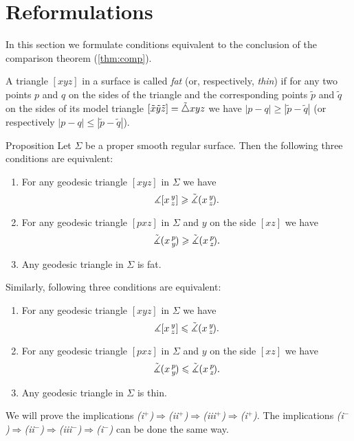 \section{Reformulations}

In this section we formulate conditions equivalent to the conclusion of the comparison theorem (\ref{thm:comp}).

A triangle $[xyz]$ in a surface is called \emph{fat} (or, respectively, \emph{thin})
if for any two points $p$ and $q$ on the sides of the triangle and the corresponding points 
$\tilde p$ and $\tilde q$ on the sides of its model triangle $[\tilde x\tilde y\tilde z]\z=\tilde \triangle xyz$ we have
$|p-q|\ge |\tilde p-\tilde q|$ (or respectively $|p-q|\le |\tilde p-\tilde q|$).


\begin{thm}{Proposition}\label{prop:comp-reformulations}
Let $\Sigma$ be a proper smooth regular surface.
Then the following three conditions are equivalent:
\begin{enumerate}[(i$^{+}$)]
\item For any geodesic triangle $[xyz]$ in $\Sigma$ we have
 \[\measuredangle[x\,{}^{y}_{z}]\geqslant\tilde\measuredangle(x\,{}^{y}_{z}\hspace{-0.2ex}).\]
\item For any geodesic triangle $[pxz]$ in $\Sigma$ and $y$ on the side $[xz]$ we have
 \[\tilde\measuredangle(x\,{}^{p}_{y}\hspace{-0.2ex}) \geqslant \tilde\measuredangle(x\,{}^{p}_{z}\hspace{-0.2ex}).\]
\item Any geodesic triangle in $\Sigma$ is fat.
\end{enumerate}

\medskip

Similarly, following three conditions are equivalent:
\begin{enumerate}[(i$^{-}$)]
\item For any geodesic triangle $[xyz]$ in $\Sigma$ we have
 \[\measuredangle[x\,{}^{y}_{z}]\leqslant\tilde\measuredangle(x\,{}^{y}_{z}\hspace{-0.2ex}).\]
\item For any geodesic triangle $[pxz]$ in $\Sigma$ and $y$ on the side $[xz]$ we have
 \[\tilde\measuredangle(x\,{}^{p}_{y}\hspace{-0.2ex}) \leqslant \tilde\measuredangle(x\,{}^{p}_{z}\hspace{-0.2ex}).\]
\item Any geodesic triangle in $\Sigma$ is thin.
\end{enumerate}

\end{thm}

 We will prove the implications \textit{(i$^{+}$)$\Rightarrow$(ii$^{+}$)$\Rightarrow$(iii$^{+}$)$\Rightarrow$(i$^{+}$)}.
The implications \textit{(i$^{-}$)$\Rightarrow$(ii$^{-}$)$\Rightarrow$(iii$^{-}$)$\Rightarrow$(i$^{-}$)} can be done the same way.

